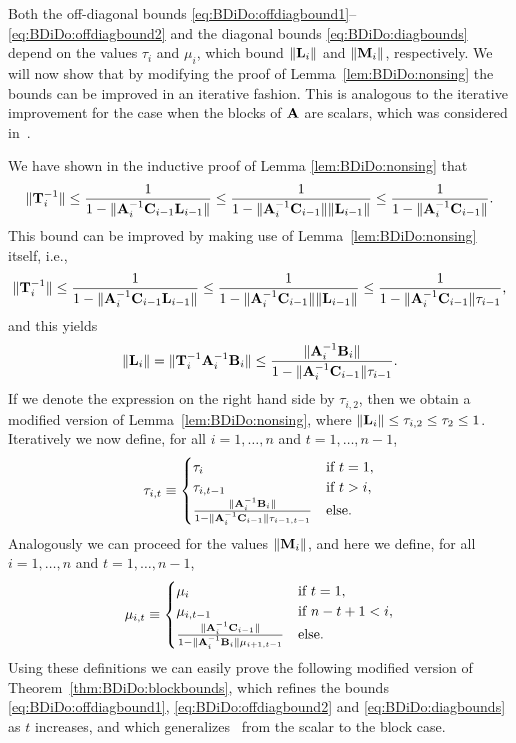 Both the off-diagonal bounds
\eqref{eq:BDiDo:offdiagbound1}--\eqref{eq:BDiDo:offdiagbound2} and
the diagonal bounds \eqref{eq:BDiDo:diagbounds} depend on the values $\tau_i$
and $\mu_i$, which bound $\|\mathbf{L}_{i}\|$ and $\|\mathbf{M}_{i}\|$, respectively. We
will now show that by modifying the proof of Lemma~\ref{lem:BDiDo:nonsing} the
bounds can be improved in an iterative fashion. This is analogous to the
iterative improvement for the case when the blocks of $\mathbf{A}$ are scalars, which
was considered in~\cite{Nabben99}.

We have shown in the inductive proof of Lemma \ref{lem:BDiDo:nonsing} that
\begin{equation*}
\|\T_i^{-1}\|\leq\frac{1}{1-\|\A_i^{-1}\C_{i-1}\L_{i-1}\|}\leq\frac{1}{1-\|\A_i^{-1}\C_{i-1}\|\|\L_{i-1}\|}\leq\frac{1}{1-\|\A_i^{-1}\C_{i-1}\|}. %
\end{equation*}
This bound can be improved by making use of Lemma~\ref{lem:BDiDo:nonsing}
itself, i.e.,
\begin{equation*}
\|\mathbf{T}_i^{-1}\|\leq\frac{1}{1-\|\mathbf{A}_i^{-1}\mathbf{C}_{i-1}\mathbf{L}_{i-1}\|}\leq\frac{1}{1-\|\mathbf{A}_i^{-1}\mathbf{C}_{i-1}\|\|\mathbf{L}_{i-1}\|}\leq\frac{1}{1-\|\mathbf{A}_i^{-1}\mathbf{C}_{i-1}\|\tau_{i-1}},
\end{equation*}
and this yields
%
\begin{equation*}%
\|\L_i\|=\|\T_i^{-1}\A_i^{-1}\B_i\|\leq\frac{\|\A_i^{-1}\B_i\|}{1-\|\A_i^{-1}\C_{i-1}\|\tau_{i-1}}.
\end{equation*}
%
If we denote the expression on the right hand side by $\tau_{i,2}$, then we
obtain a modified version of Lemma~\ref{lem:BDiDo:nonsing}, where
$\|\mathbf{L}_i\|\leq\tau_{i,2}\leq\tau_2\leq 1$. Iteratively we now define, for all
$i=1,\ldots,n$ and $t=1,\ldots,n-1$,
%
\begin{eqnarray}\label{eq:BDiDo:tau_iter}
\tau_{i,t}\equiv\begin{cases}
\tau_i&\mbox{if } t=1,\\
\tau_{i,t-1} &\mbox{if } t>i, \\
\frac{\|\mathbf{A}_i^{-1}\mathbf{B}_i\|}{1-\|\mathbf{A}_i^{-1}\mathbf{C}_{i-1}\|\tau_{i-1,t-1}} & \mbox{else}.
\end{cases}
\end{eqnarray}
%
Analogously we can proceed for the values $\|\mathbf{M}_i\|$, and here we define,
for all $i=1,\ldots,n$ and $t=1,\ldots,n-1$,
%
\begin{eqnarray}\label{eq:BDiDo:mu_iter}
\mu_{i,t}\equiv\begin{cases}
\mu_{i} &\mbox{if } t = 1, \\
\mu_{i,t-1} &\mbox{if } n-t+1 < i, \\
\frac{\|\mathbf{A}_i^{-1}\mathbf{C}_{i-1}\|}{1-\|\mathbf{A}_i^{-1}\mathbf{B}_{i}\|\mu_{i+1,t-1}} &
\mbox{else}.
\end{cases}
\end{eqnarray}
Using these definitions we can easily prove the following modified version of
Theorem~\ref{thm:BDiDo:blockbounds}, which refines the bounds
\eqref{eq:BDiDo:offdiagbound1}, \eqref{eq:BDiDo:offdiagbound2} and
\eqref{eq:BDiDo:diagbounds} as $t$ increases, and which
generalizes~\cite[Theorems~3.4 and~3.5]{Nabben99} from the scalar to the block
case.

